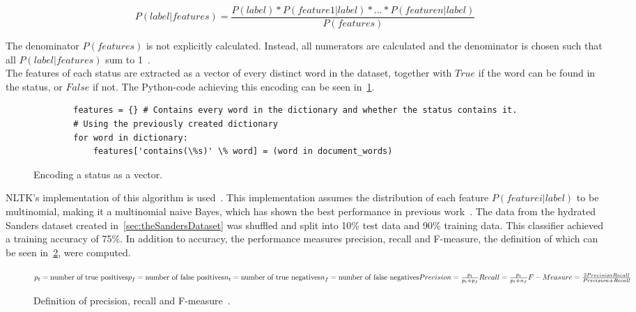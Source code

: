 \begin{equation}
    P(label|features) = \frac{P(label)*P(feature 1|label)*...*P(feature n|label)}{P(features)}
\end{equation}


The denominator $P(features)$ is not explicitly calculated.
Instead, all numerators are calculated and the denominator is chosen such that all $P(label|features)$ sum to 1~\cite{nltkDocs}.
\\
The features of each status are extracted as a vector of every distinct word in the dataset,
together with $True$ if the word can be found in the status, or $False$ if not.
The Python-code achieving this encoding can be seen in~\ref{code:extract_features}.

\begin{figure}
    \caption{Encoding a status as a vector.}
    \label{code:extract_features}
    \begin{verbatim}
        features = {} # Contains every word in the dictionary and whether the status contains it.
        # Using the previously created dictionary
        for word in dictionary:
            features['contains(\%s)' \% word] = (word in document_words)
    \end{verbatim}
\end{figure}

NLTK's implementation of this algorithm is used~\cite{nltkDocs}.
This implementation assumes the distribution of each feature $P(feature i|label)$ to be multinomial,
making it a multinomial naive Bayes, which has shown the best performance in previous work~\cite{Go2009}.
The data from the hydrated Sanders dataset created in~\ref{sec:theSandersDataset} was shuffled and split into 10\% test data and 90\% training data.
This classifier achieved a training accuracy of 75\%.
In addition to accuracy, the performance measures precision, recall and F-measure,
the definition of which can be seen in~\ref{math:precision_recall_fmeasure}, were computed.

\begin{figure}
    \caption{Definition of precision, recall and F-measure~\cite{Hong2010}.}
    \label{math:precision_recall_fmeasure}
    \begin{math}
        \\
        p_t = \textrm{number of true positives}\\
        p_f = \textrm{number of false positives}\\
        n_t = \textrm{number of true negatives}\\
        n_f = \textrm{number of false negatives}\\
        \\
        Precision = \frac{p_t}{p_t + p_f}\\
        Recall = \frac{p_t}{p_t + n_f}\\
        \\
        F-Measure = \frac{2 \* Precision \* Recall}{Precision + Recall}\\
    \end{math}
\end{figure}

